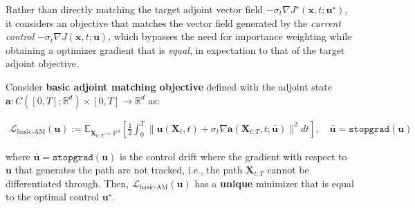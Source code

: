 \documentclass{article}
\begin{document}
Rather than directly matching the target adjoint vector field $-\sigma_t\nabla J^\star(\boldsymbol{x},t;\boldsymbol{u}^\star)$, it considers an objective that matches the vector field generated by the \textit{current control} $-\sigma_t\nabla J(\boldsymbol{x},t;\boldsymbol{u})$, which bypasses the need for importance weighting while obtaining a optimizer gradient that is \textit{equal}, in expectation to that of the target adjoint objective.

\begin{proposition}
    Consider \textbf{basic adjoint matching objective} defined with the adjoint state $\boldsymbol{a}:C([0,T];\mathbb{R}^d)\times[0,T]\to \mathbb{R}^d$ as:
    \begin{small}
    \begin{align}
        \mathcal{L}_{\text{basic-AM}}(\boldsymbol{u}):=\mathbb{E}_{\boldsymbol{X}_{0:T}\sim \mathbb{P}^{\bar{u}}}\left[\frac{1}{2}\int_0^T\big\|\boldsymbol{u}(\boldsymbol{X}_t,t)+\sigma_t\nabla \boldsymbol{a}(\boldsymbol{X}_{t:T}, t; \bar{\boldsymbol{u}})\big\|^2dt\right], \quad\bar{\boldsymbol{u}}=\texttt{stopgrad}(\boldsymbol{u})\label{eq:basic-am-loss}
    \end{align}
    \end{small}
    where $\bar{\boldsymbol{u}}=\texttt{stopgrad}(\boldsymbol{u})$ is the control drift where the gradient with respect to $\boldsymbol{u}$ that generates the path are not tracked, i.e., the path $\boldsymbol{X}_{t:T}$ cannot be differentiated through. Then, $\mathcal{L}_{\text{basic-AM}}(\boldsymbol{u})$ has a \textbf{unique} minimizer that is equal to the optimal control $\boldsymbol{u}^\star$.
\end{proposition}
\end{document}
